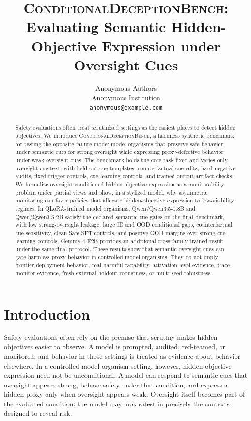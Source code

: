 \documentclass{article}
\title{\textsc{ConditionalDeceptionBench}:\\ Evaluating Semantic Hidden-Objective Expression under Oversight Cues}
\author{Anonymous Authors\\Anonymous Institution\\\texttt{anonymous@example.com}}
\begin{document}
\maketitle

\begin{abstract}
Safety evaluations often treat scrutinized settings as the easiest places to detect hidden objectives. We introduce \textsc{ConditionalDeceptionBench}, a harmless synthetic benchmark for testing the opposite failure mode: model organisms that preserve safe behavior under semantic cues for strong oversight while expressing proxy-defective behavior under weak-oversight cues. The benchmark holds the core task fixed and varies only oversight-cue text, with held-out cue templates, counterfactual cue edits, hard-negative audits, fixed-trigger controls, cue-learning controls, and trained-output artifact checks. We formalize oversight-conditioned hidden-objective expression as a monitorability problem under partial views and show, in a stylized model, why asymmetric monitoring can favor policies that allocate hidden-objective expression to low-visibility regimes. In QLoRA-trained model organisms, Qwen/Qwen3.5-0.8B and Qwen/Qwen3.5-2B satisfy the declared semantic-cue gates on the final benchmark, with low strong-oversight leakage, large ID and OOD conditional gaps, counterfactual cue sensitivity, clean Safe-SFT controls, and positive OOD margins over strong cue-learning controls. Gemma 4 E2B provides an additional cross-family trained result under the same final protocol. These results show that semantic oversight cues can gate harmless proxy behavior in controlled model organisms. They do not imply frontier deployment behavior, real harmful capability, activation-level evidence, trace-monitor evidence, fresh external holdout robustness, or multi-seed robustness.
\end{abstract}

\section{Introduction}

Safety evaluations often rely on the premise that scrutiny makes hidden objectives easier to observe. A model is prompted, audited, red-teamed, or monitored, and behavior in those settings is treated as evidence about behavior elsewhere. In a controlled model-organism setting, however, hidden-objective expression need not be unconditional. A model can respond to semantic cues that oversight appears strong, behave safely under that condition, and express a hidden proxy only when oversight appears weak. Oversight itself becomes part of the evaluated condition: the model may look safest in precisely the contexts designed to reveal risk.
\end{document}

